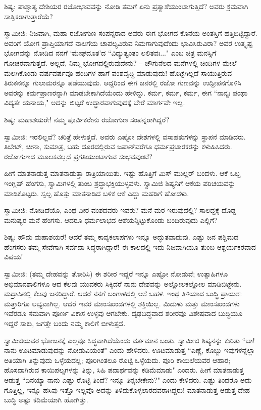 ಶಿಷ್ಯ: ಪಾಶ್ಚಾತ್ಯ ದೇಶಿಯರ ರಜೋಭಾವವನ್ನು ನೋಡಿ ತಮಗೆ ಏನು ಪ್ರತ್ಯಾಶೆಯುಂಟಾಗುತ್ತಿದೆ? ಅವರು ಕ್ರಮವಾಗಿ ಸಾತ್ವಿಕರಾಗುತ್ತಾರೆಯೆ?

ಸ್ವಾಮೀಜಿ: ನಿಜವಾಗಿ, ಮಹಾ ರಜೋಗುಣ ಸಂಪನ್ನರಾದ ಅವರು ಈಗ ಭೋಗದ ಕೊನೆಯ ಅಂತಸ್ತಿಗೆ ಹತ್ತಿಬಿಟ್ಟಿದ್ದಾರೆ. ಅವರಿಗೆ ಯೋಗ ಪ್ರಾಪ್ತಿಯಾಗದೆ ನಾಲಗೆಯ ಚಾಪಲ್ಯವಿರುವ ನಿಮಗಾಗುವುದೆಂದು ಭಾವಿಸಿರುವಿರಾ? ಅವರ ಉತ್ಕೃಷ್ಟ ಭೋಗವನ್ನು ನೋಡಿದ ನನಗೆ ‘ಮೇಘದೂತ’ದ “ವಿದ್ಯುತ್ವಂತಂ ಲಲಿತವಃ..." ಎಂಬ ಚಿತ್ರ ಮನಸ್ಸಿಗೆ ಗೋಚರವಾಗುತ್ತದೆ. ಅಲ್ಲದೆ, ನಿಮ್ಮ ಭೋಗದಲ್ಲಿರುವುದೇನು? – ಚೌಗುನೆಲದ ಮನೆಗಳಲ್ಲಿ ಚಿಂದಿಗಳ ಮೇಲೆ ಮಲಗಿಕೊಂಡು ವರ್ಷವರ್ಷವೂ ಹಂದಿಗಳ ಹಾಗೆ ವಂಶವೃದ್ಧಿ ಮಾಡುವುದು! ಹೊಟ್ಟೆಗಿಲ್ಲದೆ ಸಾಯುತ್ತಿರುವ ತಿರುಕನನ್ನೂ ಗುಲಾಮರನ್ನೂ ಪಡೆಯುವುದು. ಆದ್ದರಿಂದ ಈಗ ಜನರಲ್ಲಿ ರಜೋ ಗುಣವನ್ನು ಉದ್ದೀಪನಗೊಳಿಸಿ ಅವರನ್ನು ಕರ್ಮಪ್ರಾಣರನ್ನಾಗಿ ಮಾಡಬೇಕಾಗಿದೆಯೆಂದು ಹೇಳಿದ್ದು. ಕರ್ಮ, ಕರ್ಮ, ಕರ್ಮ, ಈಗ “ನಾನ್ಯಃ ಪಂಥಾ ವಿದ್ಯತೇ ಯನಾಯ," ಅದನ್ನು ಬಿಟ್ಟರೆ ಉದ್ಧಾರವಾಗುವುದಕ್ಕೆ ಬೇರೆ ಮಾರ್ಗವೇ ಇಲ್ಲ.

ಶಿಷ್ಯ: ಮಹಾಶಯರೇ! ನಮ್ಮ ಪೂರ್ವಿಕರೇನು ರಜೋಗುಣ ಸಂಪನ್ನರಾಗಿದ್ದರೆ?

ಸ್ವಾಮೀಜಿ: ಇರಲಿಲ್ಲವೆ? ಚರಿತ್ರೆ ಹೇಳುತ್ತದೆ. ಅವರು ಎಷ್ಟೋ ದೇಶಗಳಲ್ಲಿ ವಸಾಹತುಗಳನ್ನು ಸ್ಥಾಪನೆ ಮಾಡಿದರು. ತಿಬೇಟ್, ಚೀನಾ, ಸುಮಾತ್ರ, ಬಹು ದೂರದಲ್ಲಿರುವ ಜಪಾನ್‌ವರೆಗೂ ಧರ್ಮಪ್ರಚಾರಕರನ್ನು ಕಳುಹಿಸಿದರು. ರಜೋಗುಣದ ಮೂಲಕವಲ್ಲದೆ ಪ್ರಗತಿಯುಂಟಾಗುವ ಸಂಭವವುಂಟೆ?

ಹೀಗೆ ಮಾತನಾಡುತ್ತ ಮಾತನಾಡುತ್ತಾ ರಾತ್ರಿಯಾಯಿತು. ಇಷ್ಟು ಹೊತ್ತಿಗೆ ಮಿಸ್ ಮುಲ್ಲರ್ ಬಂದಳು. ಆಕೆ ಒಬ್ಬ ಇಂಗ್ಲಿಷ್ ಹೆಂಗಸು, ಸ್ವಾಮಿಗಳಲ್ಲಿ ತುಂಬ ಶ್ರದ್ಧಾಭಕ್ತಿಯುಳ್ಳವಳು. ಸ್ವಾಮಿಜಿ ಶಿಷ್ಯನಿಗೆ ಆಕೆಯ ಪರಿಚಯವನ್ನು ಮಾಡಿಕೊಟ್ಟರು. ಸ್ವಲ್ಪ ಹೊತ್ತು ಮಾತನಾಡಿದ ಬಳಿಕ ಆಕೆ ಎದ್ದು ಮಹಡಿಗೆ ಹೋದಳು.

ಸ್ವಾಮೀಜಿ: ನೋಡಿದೆಯೊ, ಎಂಥ ವೀರ ವಂಶದವರು ಇವರು? ಮನೆ ಮಠ ಇರುವುದೆಲ್ಲಿ? ಸಾಲದ್ದಕ್ಕೆ ದೊಡ್ಡ ಮನುಷ್ಯರ ಮನೆ ಹೆಂಗಸು. ಆದರೂ ಧರ್ಮಲಾಭದ ಆಶೆಯನ್ನಿಟ್ಟುಕೊಂಡು ಬಂದಿರುವುದು ಎಲ್ಲಿಗೆ?

ಶಿಷ್ಯ: ಹೌದು ಮಹಾಶಯರೆ! ಆದರೆ ತಮ್ಮ ಕಾವ್ಯಕಲಾಪಗಳು ಇನ್ನೂ ಅದ್ಭುತವಾದುವು. ಎಷ್ಟು ಜನ ಪಶ್ಚಿಮದ ಹೆಂಗಸರು ತಮ್ಮ ಸೇವೆಗಾಗಿ ಸರ್ವದಾ ಸಿದ್ಧರಾಗಿದ್ದಾರೆ! ಈ ಕಾಲದಲ್ಲಿ ಇದು ನಿಜವಾಗಿಯೂ ತುಂಬ ಆಶ್ಚರ್ಯಕರವಾದ ವಿಷಯ!

ಸ್ವಾಮೀಜಿ: (ತಮ್ಮ ದೇಹವನ್ನು ತೋರಿಸಿ) ಈ ಶರೀರ ಇದ್ದರೆ ಇನ್ನೂ ಎಷ್ಟೋ ನೋಡುವೆ; ಉತ್ಸಾಹಿಗಳೂ ಅಭಿಮಾನಶಾಲಿಗಳೂ ಆದ ಕೆಲವು ಯುವಕರು ಸಿಕ್ಕಿದರೆ ನಾನು ದೇಶವನ್ನು ಅಲ್ಲೋಲಕಲ್ಲೋಲ ಮಾಡಿಬಿಟ್ಟೇನು. ಮದ್ರಾಸಿನಲ್ಲಿ ಕೆಲವು ಜನರಿದ್ದಾರೆ. ಆದರೆ ನನಗೆ ಬಂಗಾಳದಲ್ಲಿ ಆಸೆ ಬಹಳ. ಇಂಥ ತಿಳಿಯಾದ ಬುದ್ಧಿ ಪ್ರಾಯಶಃ ಮತ್ತಾರಿಗೂ ಲಭ್ಯವಾಗಿಲ್ಲ. ಆದರೆ ಇವರ ಮಾಂಸಖಂಡಗಳಲ್ಲಿ ಶಕ್ತಿಯಿಲ್ಲ. ಮಿದುಳು ಮತ್ತು ಮಾಂಸಖಂಡಗಳು ಇವೆರಡೂ ಸಮವಾಗಿ ಪೂರ್ಣ ವಿಕಾಸ ಉಳ್ಳವು ಆಗಬೇಕು. ದೃಢಬದ್ಧವಾದ ಶರೀರವೂ ವಿಶೇಷವಾದ ಬುದ್ಧಿಯೂ ಇದ್ದರೆ ಸಾಕು, ಜಗತ್ತೇ ಬಂದು ನಮ್ಮ ಕಾಲಿಗೆ ಬೀಳುತ್ತದೆ.

ಸ್ವಾಮಿಜಿಯವರ ಭೋಜನಕ್ಕೆ ಎಲ್ಲವೂ ಸಿದ್ಧವಾಗಿದೆಯೆಂದು ವರ್ತಮಾನ ಬಂತು. ಸ್ವಾಮೀಜಿ ಶಿಷ್ಯನನ್ನು ಕುರಿತು “ಬಾ! ನಾನು ಊಟಮಾಡುವುದನ್ನು ನೋಡುವಿಯಂತೆ" ಎಂದು ಹೇಳಿದರು. ಊಟಮಾಡುತ್ತ “ಎಣ್ಣೆ, ಕೊಬ್ಬು ಇವುಗಳನ್ನೆಲ್ಲಾ ಅತಿಯಾಗಿ ತಿನ್ನುವುದು ಒಳ್ಳೆಯದಲ್ಲ; ಪೂರಿಗಿಂತಲೂ ರೊಟ್ಟಿ ಒಳ್ಳೆಯದು. ಪೂರಿ ಕಾಯಿಲೆಯವರ ಆಹಾರ; ಹೊಸದಾಗಿರುವ ಕಾಯಿಪಲ್ಯಗಳನ್ನು ತಿನ್ನು, ಸಿಹಿ ಪದಾರ್ಥವನ್ನು ಕಡಿಮೆಮಾಡು" ಎಂದರು. ಹೀಗೆ ಮಾತನಾಡುತ್ತ ಆಡುತ್ತ “ಏನಯ್ಯಾ ನಾನು ಎಷ್ಟು ರೊಟ್ಟಿ ತಿಂದೆ? ಇನ್ನೂ ತಿನ್ನಬೇಕೇನು?" ಎಂದು ಕೇಳಿದರು. ಎಷ್ಟು ತಿಂದರೊ ಅದು ಗೊತ್ತಿಲ್ಲ, ಇನ್ನೂ ಹಸಿವು ಇತ್ತೊ ಇಲ್ಲವೊ ಅದನ್ನು ತಿಳಿದುಕೊಳ್ಳಲಾರದವರಾಗಿದ್ದರು! ಮಾತನಾಡುತ್ತ ಆಡುತ್ತ ದೇಹ ಬುದ್ಧಿ ಅಷ್ಟು ಕಡಿಮೆಯಾಗಿ ಹೋಗಿತ್ತು.

